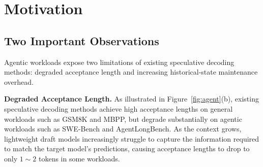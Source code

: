 \section{Motivation} \label{sec:motivation}

\subsection{Two Important Observations}

Agentic workloads expose two limitations of existing speculative decoding methods: degraded acceptance length and increasing historical-state maintenance overhead.


\textbf{Degraded Acceptance Length.} As illustrated in Figure~\ref{fig:agent}(b), existing speculative decoding methods achieve high acceptance lengths on general workloads such as GSM8K and MBPP, but degrade substantially on agentic workloads such as SWE-Bench and AgentLongBench. As the context grows, lightweight draft models increasingly struggle to capture the information required to match the target model's predictions, causing acceptance lengths to drop to only \(1\sim2\) tokens in some workloads.



